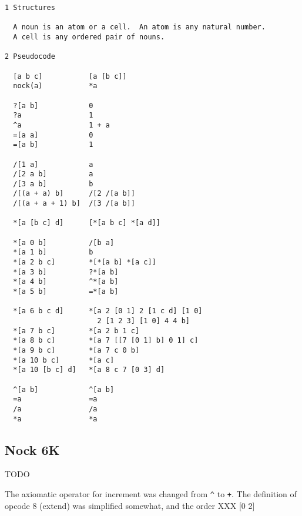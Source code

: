 \documentclass[twoside]{article}
\begin{document}
\begin{lstlisting}[label=lst:nock7k,caption={Nock 7K, \textit{terminus ad quem} 14 November 2010.},style=listingcode]
1 Structures

  A noun is an atom or a cell.  An atom is any natural number.
  A cell is any ordered pair of nouns.

2 Pseudocode

  [a b c]           [a [b c]]
  nock(a)           *a

  ?[a b]            0
  ?a                1
  ^a                1 + a
  =[a a]            0
  =[a b]            1

  /[1 a]            a
  /[2 a b]          a
  /[3 a b]          b
  /[(a + a) b]      /[2 /[a b]]
  /[(a + a + 1) b]  /[3 /[a b]]

  *[a [b c] d]      [*[a b c] *[a d]]

  *[a 0 b]          /[b a]
  *[a 1 b]          b
  *[a 2 b c]        *[*[a b] *[a c]]
  *[a 3 b]          ?*[a b]
  *[a 4 b]          ^*[a b]
  *[a 5 b]          =*[a b]

  *[a 6 b c d]      *[a 2 [0 1] 2 [1 c d] [1 0]
                      2 [1 2 3] [1 0] 4 4 b]
  *[a 7 b c]        *[a 2 b 1 c]
  *[a 8 b c]        *[a 7 [[7 [0 1] b] 0 1] c]
  *[a 9 b c]        *[a 7 c 0 b]
  *[a 10 b c]       *[a c]
  *[a 10 [b c] d]   *[a 8 c 7 [0 3] d]

  ^[a b]            ^[a b]
  =a                =a
  /a                /a
  *a                *a
\end{lstlisting}

\subsection{Nock 6K}

TODO

The axiomatic operator for increment was changed from \texttt{\^} to \texttt{+}.  The definition of opcode 8 (extend) was simplified somewhat, and the order XXX [0 2]
\end{document}
